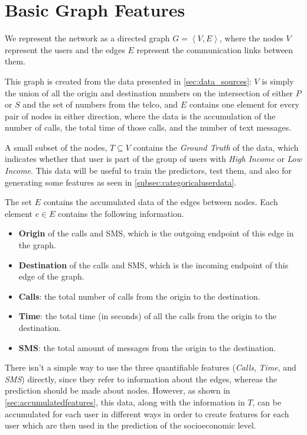 
\section{Basic Graph Features}
\label{sec:graphfeatures}

We represent the network as a directed graph $G = \left< V, E \right>$, where the nodes $V$ represent the users and the edges $E$ represent the communication links between them.

This graph is created from the data presented in \cref{sec:data_sources}: $V$ is simply the union of all the origin and destination numbers on the intersection of either $P$ or $S$ and the set of numbers from the telco, and $E$ contains one element for every pair of nodes in either direction, where the data is the accumulation of the number of calls, the total time of those calls, and the number of text messages.


A small subset of the nodes, $T \subseteq V$ contains the \emph{Ground Truth} of the data, which indicates whether that user is part of the group of users with \emph{High Income} or \emph{Low Income}. This data will be useful to train the predictors, test them, and also for generating some features as seen in \cref{subsec:categoricaluserdata}.

The set $E$ contains the accumulated data of the edges between nodes. Each element $e \in E$ contains the following information.

\begin{itemize}
	\item \textbf{Origin} of the calls and SMS, which is the outgoing endpoint of this edge in the graph. %
	\item \textbf{Destination} of the calls and SMS, which is the incoming endpoint of this edge of the graph. %
	\item \textbf{Calls}: the total number of calls from the origin to the destination.
	\item \textbf{Time}: the total time (in seconds) of all the calls from the origin to the destination.
	\item \textbf{SMS}: the total amount of messages from the origin to the destination.
\end{itemize}

There isn't a simple way to use the three quantifiable features (\emph{Calls}, \emph{Time}, and \emph{SMS}) directly, since they refer to information about the edges,
whereas the prediction should be made about nodes. However, as shown in \cref{sec:accumulatedfeatures}, this data, along with the information in $T$, can be accumulated for each user in different ways in order to create features for each user which are then used in the prediction of the socioeconomic level.
